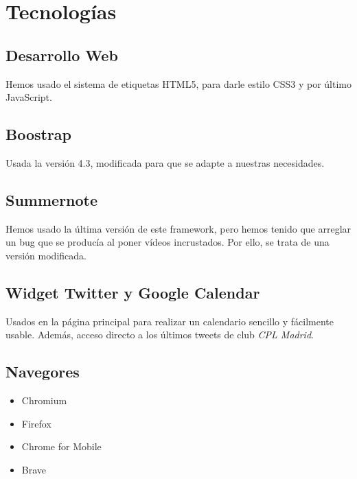 \documentclass[10pt, spanish, pdftex]{template/UC3M_document}
\begin{document}
\newpage

\section{Tecnologías}
\subsection{Desarrollo Web}
Hemos usado el sistema de etiquetas HTML5, para darle estilo CSS3 y por último JavaScript.
\subsection{Boostrap}
Usada la versión 4.3, modificada para que se adapte a nuestras necesidades.
\subsection{Summernote}
Hemos usado la última versión de este framework, pero hemos tenido que arreglar un bug que se producía al poner vídeos incrustados. Por ello, se trata de una versión modificada.
\subsection{Widget Twitter y Google Calendar}
Usados en la página principal para realizar un calendario sencillo y fácilmente usable. Además, acceso directo a los últimos tweets de club \textit{CPL Madrid}.
\subsection{Navegores}
\begin{itemize}
  \item Chromium
  \item Firefox
  \item Chrome for Mobile
  \item Brave
\end{itemize}

\newpage
\end{document}
